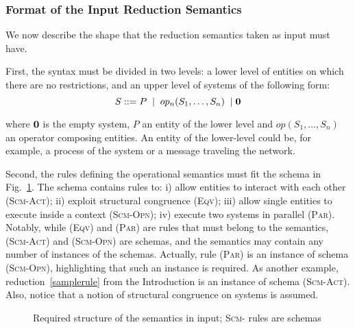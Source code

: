 \documentclass{article}[12pt,a4paper]
\theoremstyle{definition}
\newcommand{\paral}{\;|\;}
\begin{document}
\subsubsection{Format of the Input Reduction Semantics}

We now describe the shape that the reduction semantics taken as input
must have.

First, the syntax must be divided in two levels: a lower level of entities on which there are no restrictions, and an upper level of systems of the following
form:
\[
  S::=P\;\paral \;\op(S_1,\ldots,S_n)\; \paral \nil
\]

where ${\bf{0}}$ is the empty system, $P$ an entity of the lower level and $op(S_1,\ldots,S_n)$ an operator
composing entities. An entity of the lower-level could be, for example, a process of the system or
a message traveling the network.


Second, the rules defining the operational semantics must fit the schema in Fig.~\ref{fig:forwardrules}.
The schema contains rules to: i) allow entities to interact with each other (\textsc{Scm-Act}); ii)
exploit structural congruence (\textsc{Eqv}); iii) allow single entities to execute inside a context (\textsc{Scm-Opn});
iv) execute two systems in parallel (\textsc{Par}). Notably, while (\textsc{Eqv}) and (\textsc{Par}) are rules that must belong to the semantics, (\textsc{Scm-Act}) and (\textsc{Scm-Opn}) are schemas, and the semantics may contain any number of instances of the schemas. Actually, rule (\textsc{Par}) is an instance of schema (\textsc{Scm-Opn}), highlighting that such an instance is required. As another example, reduction~\ref{samplerule} from the Introduction is an instance of schema (\textsc{Scm-Act}).
Also, notice that a notion of structural congruence on systems is assumed. 

\begin{figure}[t]
  {\footnotesize
    }
  \caption{Required structure of the semantics in input; \textsc{Scm-} rules are schemas}
  \label{fig:forwardrules}
\end{figure}
\end{document}
